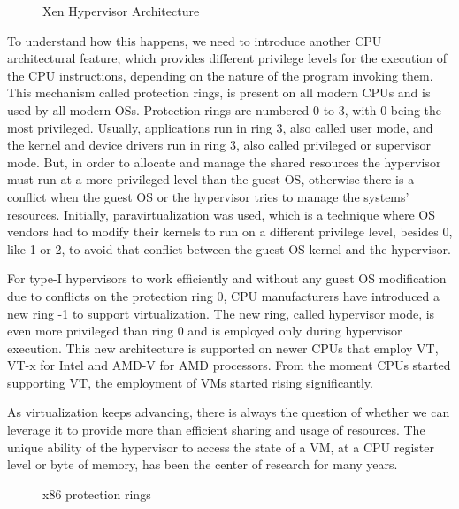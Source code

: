 \begin{figure}
	\centering
	
	\caption{Xen Hypervisor Architecture}
	\label{img:xen}
\end{figure}

\par To understand how this happens, we need to introduce another \ac{CPU} architectural feature, which provides different privilege levels for the execution of the \ac{CPU} instructions, depending on the nature of the program invoking them. This mechanism called protection rings, is present on all modern \ac{CPU}s and is used by all modern \ac{OS}s. Protection rings are numbered 0 to 3, with 0 being the most privileged. Usually, applications run in ring 3, also called user mode, and the kernel and device drivers run in ring 3, also called privileged or supervisor mode. But, in order to allocate and manage the shared resources the hypervisor must run at a more privileged level than the guest \ac{OS}, otherwise there is a conflict when the guest \ac{OS} or the hypervisor tries to manage the systems' resources. Initially, paravirtualization was used, which is a technique where \ac{OS} vendors had to modify their kernels to run on a different privilege level, besides 0, like 1 or 2, to avoid that conflict between the guest \ac{OS} kernel and the hypervisor.

\par For type-I hypervisors to work efficiently and without any guest \ac{OS} modification due to conflicts on the protection ring 0, \ac{CPU} manufacturers have introduced a new ring -1 to support virtualization. The new ring, called hypervisor mode, is even more privileged than ring 0 and is employed only during hypervisor execution. This new architecture is supported on newer \ac{CPU}s that employ \ac{VT}, VT-x for Intel and AMD-V for AMD processors. From the moment \ac{CPU}s started supporting \ac{VT}, the employment of \ac{VM}s started rising significantly.

As virtualization keeps advancing, there is always the question of whether we can leverage it to provide more than efficient sharing and usage of resources. The unique ability of the hypervisor to access the state of a \ac{VM}, at a \ac{CPU} register level or byte of memory, has been the center of research for many years. 

\begin{figure}
	\centering
	
	\caption{x86 protection rings}
	\label{fig:rings}
\end{figure}

